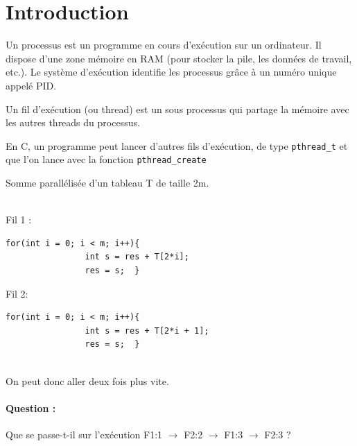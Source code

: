 
\section{Introduction}

\begin{definition}
	Un processus est un programme en cours d'exécution sur un ordinateur. Il dispose d'une zone mémoire en RAM (pour stocker la pile, les données de travail, etc.). Le système d'exécution identifie les processus grâce à un numéro unique appelé PID. 
\end{definition}

\begin{definition}
	Un fil d'exécution (ou thread) est un sous processus qui partage la mémoire avec les autres threads du processus.
\end{definition}

\begin{impl}
	En C, un programme peut lancer d'autres fils d'exécution, de type \texttt{pthread\_t} et que l'on lance avec la fonction \texttt{pthread\_create}
\end{impl}

\begin{example}
	\label{20-somme-para} \normalfont
	Somme parallélisée d'un tableau T de taille 2m.\\\\
	\begin{minipage}{0.45\linewidth}
		Fil 1 :
		\begin{lstlisting}[style=CStyle]
			for(int i = 0; i < m; i++){
				int s = res + T[2*i];
				res = s;  }\end{lstlisting}
	\end{minipage} \quad
	\begin{minipage}{0.45\linewidth}
		Fil 2:
		\begin{lstlisting}[style=CStyle]
			for(int i = 0; i < m; i++){
				int s = res + T[2*i + 1];
				res = s;  }\end{lstlisting}
	\end{minipage}\\
	On peut donc aller deux fois plus vite.
	
	\paragraph{Question :} Que se passe-t-il sur l'exécution F1:1 $\to$ F2:2 $\to$ F1:3 $\to$ F2:3 ?
\end{example}

